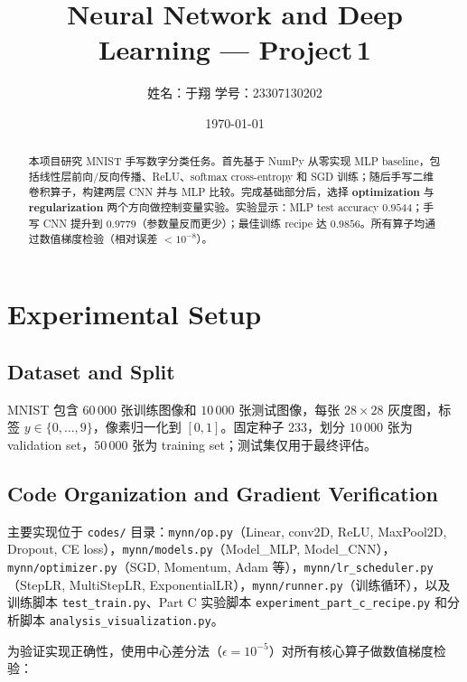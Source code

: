 \documentclass[11pt,fontset=fandol]{ctexart}
\title{\bfseries Neural Network and Deep Learning --- Project\,1}
\author{姓名：于翔 \quad 学号：23307130202}
\date{\today}
\begin{document}
\maketitle

\begin{abstract}
\noindent
本项目研究 MNIST 手写数字分类任务。首先基于 NumPy 从零实现 MLP baseline，包括线性层前向/反向传播、ReLU、softmax cross-entropy 和 SGD 训练；随后手写二维卷积算子，构建两层 CNN 并与 MLP 比较。完成基础部分后，选择 \textbf{optimization} 与 \textbf{regularization} 两个方向做控制变量实验。实验显示：MLP test accuracy $0.9544$；手写 CNN 提升到 $0.9779$（参数量反而更少）；最佳训练 recipe 达 $0.9856$。所有算子均通过数值梯度检验（相对误差 $<10^{-8}$）。
\end{abstract}

\section{Experimental Setup}

\subsection{Dataset and Split}

MNIST 包含 $60\,000$ 张训练图像和 $10\,000$ 张测试图像，每张 $28\times28$ 灰度图，标签 $y\in\{0,\dots,9\}$，像素归一化到 $[0,1]$。固定种子 $233$，划分 $10\,000$ 张为 validation set，$50\,000$ 张为 training set；测试集仅用于最终评估。

\subsection{Code Organization and Gradient Verification}

主要实现位于 \texttt{codes/} 目录：\texttt{mynn/op.py}（Linear, conv2D, ReLU, MaxPool2D, Dropout, CE loss），\texttt{mynn/models.py}（Model\_MLP, Model\_CNN），\texttt{mynn/optimizer.py}（SGD, Momentum, Adam 等），\texttt{mynn/lr\_scheduler.py}（StepLR, MultiStepLR, ExponentialLR），\texttt{mynn/runner.py}（训练循环），以及训练脚本 \texttt{test\_train.py}、Part C 实验脚本 \texttt{experiment\_part\_c\_recipe.py} 和分析脚本 \texttt{analysis\_visualization.py}。

为验证实现正确性，使用中心差分法（$\epsilon=10^{-5}$）对所有核心算子做数值梯度检验：
\end{document}

